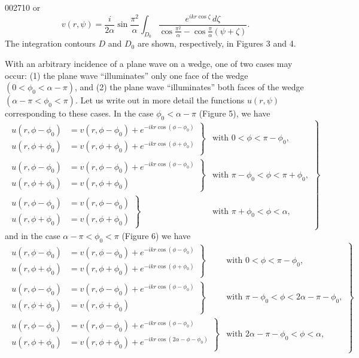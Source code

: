 \begin{scanpage}{0027}{10}
or
\[v(r,\psi)=\frac{i}{2\alpha}\sin\frac{\pi^2}{\alpha}\int_{D_0}\frac{e^{ikr\cos\zeta}\,d\zeta}{\cos\frac{\pi^2}{\alpha}-\cos\frac\pi\alpha(\psi+\zeta)}.\tag{1.30}\]
The integration contours $D$ and $D_0$ are shown, respectively, in Figures 3 and 4.

With an arbitrary incidence of a plane wave on a wedge, one of two cases may occur: (1) the plane wave ``illuminates'' only one face of the wedge $(0<\phi_0<\alpha-\pi)$, and (2) the plane wave ``illuminates'' both faces of the wedge $(\alpha-\pi<\phi_0<\pi)$. Let us write out in more detail the functions $u(r,\psi)$ corresponding to these cases. In the case $\phi_0<\alpha-\pi$ (Figure 5), we have
\[\left.\begin{aligned}\left.\begin{aligned}u(r,\phi-\phi_0)&=v(r,\phi-\phi_0)+e^{-ikr\cos(\phi-\phi_0)}\\u(r,\phi+\phi_0)&=v(r,\phi+\phi_0)+e^{-ikr\cos(\phi+\phi_0)}\end{aligned}\right\}&\text{with }0<\phi<\pi-\phi_0,\\\left.\begin{aligned}u(r,\phi-\phi_0)&=v(r,\phi-\phi_0)+e^{-ikr\cos(\phi-\phi_0)}\\u(r,\phi+\phi_0)&=v(r,\phi+\phi_0)\end{aligned}\right\}&\text{with }\pi-\phi_0<\phi<\pi+\phi_0,\\\left.\begin{aligned}u(r,\phi-\phi_0)&=v(r,\phi-\phi_0)\\u(r,\phi+\phi_0)&=v(r,\phi+\phi_0)\end{aligned}\right\}&\text{with }\pi+\phi_0<\phi<\alpha,\end{aligned}\right\}\tag{1.31}\]
and in the case $\alpha-\pi<\phi_0<\pi$ (Figure 6) we have
\[\left.\begin{aligned}\left.\begin{aligned}u(r,\phi-\phi_0)&=v(r,\phi-\phi_0)+e^{-ikr\cos(\phi-\phi_0)}\\u(r,\phi+\phi_0)&=v(r,\phi+\phi_0)+e^{-ikr\cos(\phi+\phi_0)}\end{aligned}\right\}&\text{with }0<\phi<\pi-\phi_0,\\\left.\begin{aligned}u(r,\phi-\phi_0)&=v(r,\phi-\phi_0)+e^{-ikr\cos(\phi-\phi_0)}\\u(r,\phi+\phi_0)&=v(r,\phi+\phi_0)\end{aligned}\right\}&\text{with }\pi-\phi_0<\phi<2\alpha-\pi-\phi_0,\\\left.\begin{aligned}u(r,\phi-\phi_0)&=v(r,\phi-\phi_0)+e^{-ikr\cos(\phi-\phi_0)}\\u(r,\phi+\phi_0)&=v(r,\phi+\phi_0)+e^{-ikr\cos(2\alpha-\phi-\phi_0)}\end{aligned}\right\}&\text{with }2\alpha-\pi-\phi_0<\phi<\alpha,\end{aligned}\right\}\tag{1.32}\]
\end{scanpage}
